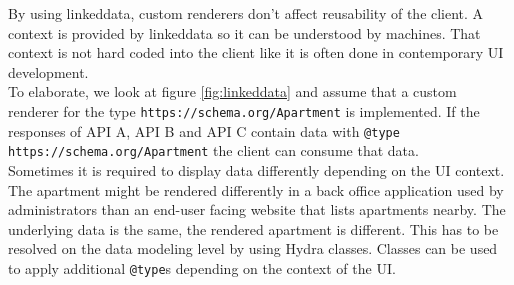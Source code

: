 By using \gls{linkeddata}, custom renderers don't affect reusability of the client. A context is provided by \gls{linkeddata} so it can be understood by machines. That context is not hard coded into the client like it is often done in contemporary UI development. \\
To elaborate, we look at figure \ref{fig:linkeddata} and assume that a custom renderer for the type \lstinline{https://schema.org/Apartment} is implemented. If the responses of API A, API B and API C contain data with \lstinline{@type} \lstinline{https://schema.org/Apartment} the client can consume that data. \\
Sometimes it is required to display data differently depending on the UI context. The apartment might be rendered differently in a back office application used by administrators than an end-user facing website that lists apartments nearby. The underlying data is the same, the rendered apartment is different. This has to be resolved on the data modeling level by using Hydra classes. Classes can be used to apply additional \lstinline{@type}s depending on the context of the UI.
